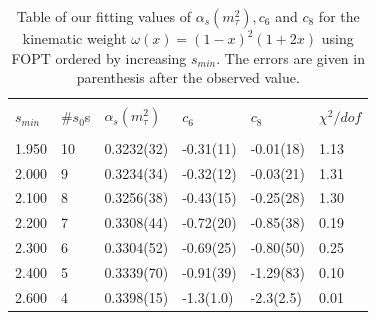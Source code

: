 \documentclass[../../index.tex]{subfiles}
\begin{document}
\begin{table}[H]
  \centering
  \begin{tabular}{llllll}
    \toprule \\
    $s_{min}$ & \#$s_0$s & $\alpha_s(m_\tau^2)$ & $c_6$ & $c_8$ & $\chi^2/dof$  \\
    \hline \\
    1.950 & 10 & 0.3232(32) & -0.31(11) & -0.01(18) & 1.13 \\
    2.000 & 9 & 0.3234(34) & -0.32(12) & -0.03(21) & 1.31 \\
    2.100 & 8 & 0.3256(38) & -0.43(15) & -0.25(28) & 1.30 \\
    \rowcolor{primary}
    2.200 & 7 & 0.3308(44) & -0.72(20) & -0.85(38) & 0.19 \\
    \rowcolor{primary}
    2.300 & 6 & 0.3304(52) & -0.69(25) & -0.80(50) & 0.25 \\
    \rowcolor{primary}
    2.400 & 5 & 0.3339(70) & -0.91(39) & -1.29(83) & 0.10 \\
    2.600 & 4 & 0.3398(15) & -1.3(1.0) & -2.3(2.5) & 0.01  \\
    \bottomrule
  \end{tabular}
  \caption{Table of our fitting values of $\alpha_s(m_\tau^2), c_6$ and $c_8$ for the kinematic weight
    $\omega(x)=(1-x)^2(1+2x)$ using FOPT ordered by increasing $s_{min}$. The
    errors are given in parenthesis after the observed value.}
  \label{table:fitWKinAlD6D8}
\end{table}
\end{document}
